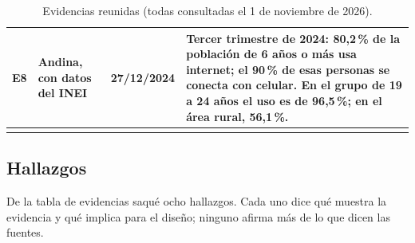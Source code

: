 \begin{longtable}{|p{0.8cm}|p{3.7cm}|p{2.2cm}|p{7.1cm}|}
	E8 & Andina, con datos del INEI \cite{inei} & 27/12/2024 & Tercer trimestre de 2024: 80,2\,\% de la población de 6 años o más usa internet; el 90\,\% de esas personas se conecta con celular. En el grupo de 19 a 24 años el uso es de 96,5\,\%; en el área rural, 56,1\,\%. \\\hline
	\caption{Evidencias reunidas (todas consultadas el 1 de noviembre de 2026).}
	\label{tab:evidencias}
\end{longtable}

\subsection{Hallazgos}
De la tabla de evidencias saqué ocho hallazgos. Cada uno dice qué muestra la evidencia y qué implica para el diseño; ninguno afirma más de lo que dicen las fuentes.

